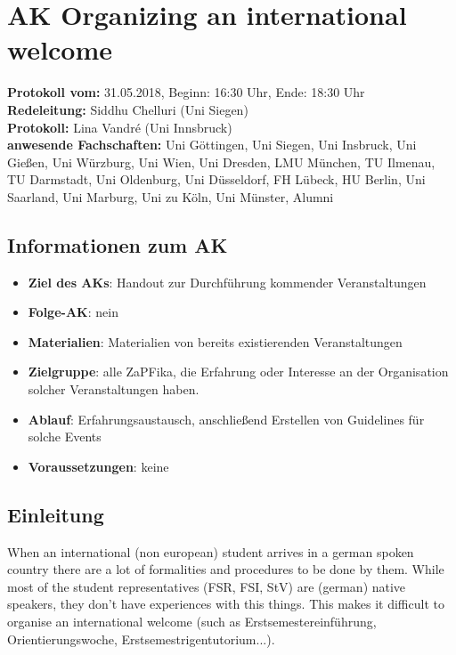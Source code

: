 
\section{AK Organizing an international welcome}

  \textbf{Protokoll vom:} 31.05.2018, %
  Beginn: 16:30 Uhr, %
  Ende: 18:30 Uhr \\ %
  \textbf{Redeleitung:} Siddhu Chelluri (Uni Siegen) \\
  \textbf{Protokoll:} Lina Vandré (Uni Innsbruck) \\
  \textbf{anwesende Fachschaften:} Uni Göttingen, Uni Siegen, Uni Insbruck, Uni Gießen, Uni Würzburg, Uni Wien, Uni Dresden, LMU München, TU Ilmenau, TU Darmstadt, Uni Oldenburg, Uni Düsseldorf, FH Lübeck, HU Berlin, Uni Saarland, Uni Marburg, Uni zu Köln, Uni Münster, Alumni

  \subsection*{Informationen zum AK}
    \begin{itemize}
    	\item \textbf{Ziel des AKs}: Handout zur Durchführung kommender Veranstaltungen
    	\item \textbf{Folge-AK}: nein
      \item \textbf{Materialien}: Materialien von bereits existierenden Veranstaltungen
    	\item \textbf{Zielgruppe}: alle ZaPFika, die Erfahrung oder Interesse an der Organisation solcher Veranstaltungen haben.
    	\item \textbf{Ablauf}: Erfahrungsaustausch, anschließend Erstellen von Guidelines für solche Events
    	\item \textbf{Voraussetzungen}: keine
    \end{itemize}

  \subsection*{Einleitung}
    When an international (non european) student arrives in a german spoken country there are a lot of
    formalities and procedures to be done by them. While most of the student representatives (FSR, FSI, StV)
    are (german) native speakers, they don't have experiences with this things. This makes it difficult to
    organise an international welcome (such as Erstsemestereinführung, Orientierungswoche, Erstsemestrigentutorium...). \\

